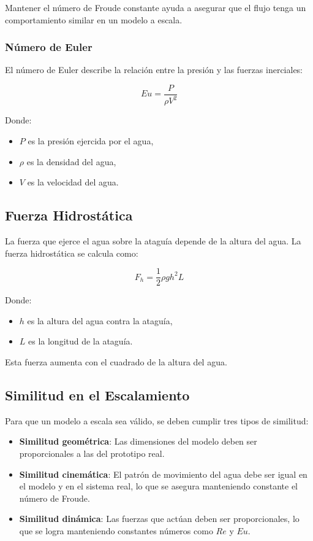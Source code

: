 Mantener el número de Froude constante ayuda a asegurar que el flujo tenga un comportamiento similar en un modelo a escala.

\subsubsection{Número de Euler}
El número de Euler describe la relación entre la presión y las fuerzas inerciales:

\begin{equation}
Eu = \frac{P}{\rho V^2}
\end{equation}

Donde:
\begin{itemize}
    \item $P$ es la presión ejercida por el agua,
    \item $\rho$ es la densidad del agua,
    \item $V$ es la velocidad del agua.
\end{itemize}

\subsection{Fuerza Hidrostática}
La fuerza que ejerce el agua sobre la ataguía depende de la altura del agua. La fuerza hidrostática se calcula como:

\begin{equation}
F_h = \frac{1}{2} \rho g h^2 L
\end{equation}

Donde:
\begin{itemize}
    \item $h$ es la altura del agua contra la ataguía,
    \item $L$ es la longitud de la ataguía.
\end{itemize}

Esta fuerza aumenta con el cuadrado de la altura del agua.

\subsection{Similitud en el Escalamiento}
Para que un modelo a escala sea válido, se deben cumplir tres tipos de similitud:

\begin{itemize}
    \item \textbf{Similitud geométrica}: Las dimensiones del modelo deben ser proporcionales a las del prototipo real.
    \item \textbf{Similitud cinemática}: El patrón de movimiento del agua debe ser igual en el modelo y en el sistema real, lo que se asegura manteniendo constante el número de Froude.
    \item \textbf{Similitud dinámica}: Las fuerzas que actúan deben ser proporcionales, lo que se logra manteniendo constantes números como $Re$ y $Eu$.
\end{itemize}


